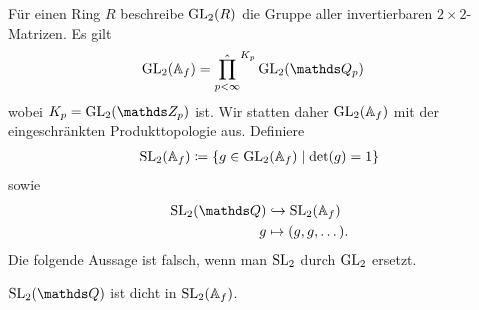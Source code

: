Für einen Ring $R$ beschreibe $\operatorname{GL}_2(R)$ die Gruppe aller invertierbaren $2\times 2$-Matrizen.
Es gilt
\begin{align*}
\GL_2(\A_f)&=\hat{\prod_{p<\infty}}^{K_p} \GL_2(\Q_p)
\end{align*}
wobei $K_p=\GL_2(\Z_p)$ ist.
Wir statten daher $\operatorname{GL}_2(\mathbb{A}_f)$ mit der eingeschränkten Produkttopologie aus.
Definiere
\begin{align*}
\operatorname{SL}_2(\mathbb{A}_f)\coloneqq \{g \in \operatorname{GL}_2(\mathbb{A}_f) \mid \det(g)=1\}
\end{align*}
sowie
\begin{align*}
\SL_2(\Q)&\hookrightarrow \SL_2(\A_f)\\
g &\mapsto (g,g,\dots).
\end{align*}
Die folgende Aussage ist falsch, wenn man $\operatorname{SL}_2$ durch $\operatorname{GL}_2$ ersetzt.
\begin{prop}
$\SL_2(\Q)$ ist dicht in $\operatorname{SL}_2(\mathbb{A}_f)$.
\end{prop}
